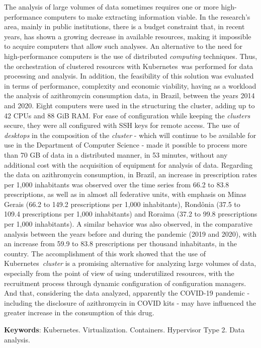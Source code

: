 
\begin{resumo}[Abstract]
    The analysis of large volumes of data sometimes requires one or more high-performance computers to make extracting information viable. In the research's area, mainly in public institutions, there is a budget constraint that, in recent years, has shown a growing decrease in available resources, making it impossible to acquire computers that allow such analyses. An alternative to the need for high-performance computers is the use of distributed \emph{computing} techniques. Thus, the orchestration of clustered resources with Kubernetes\textregistered\ was performed for data processing and analysis. In addition, the feasibility of this solution was evaluated in terms of performance, complexity and economic viability, having as a workload the analysis of azithromycin consumption data, in Brazil, between the years 2014 and 2020. Eight computers were used in the structuring the cluster, adding up to 42 CPUs and 88 GiB RAM. For ease of configuration while keeping the \emph{clusters} secure, they were all configured with SSH keys for remote access. The use of \emph{desktops} in the composition of the \emph{cluster} - which will continue to be available for use in the Department of Computer Science - made it possible to process more than 70 GB of data in a distributed manner, in 53 minutes, without any additional cost with the acquisition of equipment for analysis of data. Regarding the data on azithromycin consumption, in Brazil, an increase in prescription rates per 1,000 inhabitants was observed over the time series from 66.2 to 83.8 prescriptions, as well as in almost all federative units, with emphasis on Minas Gerais (66.2 to 149.2 prescriptions per 1,000 inhabitants), Rondônia (37.5 to 109.4 prescriptions per 1,000 inhabitants) and Roraima (37.2 to 99.8 prescriptions per 1,000 inhabitants). A similar behavior was also observed, in the comparative analysis between the years before and during the pandemic (2019 and 2020), with an increase from 59.9 to 83.8 prescriptions per thousand inhabitants, in the country. The accomplishment of this work showed that the use of Kubernetes\textregistered\ \emph{cluster} is a promising alternative for analyzing large volumes of data, especially from the point of view of using underutilized resources, with the recruitment process through dynamic configuration of configuration managers. And that, considering the data analyzed, apparently the COVID-19 pandemic - including the disclosure of azithromycin in COVID kits - may have influenced the greater increase in the consumption of this drug.


    \textbf{Keywords}: Kubernetes. Virtualization. Containers. Hypervisor Type 2. Data analysis.
\end{resumo}

